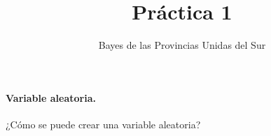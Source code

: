 \documentclass[a4paper,10pt]{article}
\title{Práctica 1}
\author{Bayes de las Provincias Unidas del Sur}
\begin{document}
\maketitle

\tableofcontents

\paragraph{Variable aleatoria.} ¿Cómo se puede crear una variable aleatoria?
\end{document}
